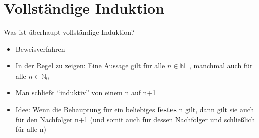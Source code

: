 \def\tutdate{17.11.2016}



\section{Vollständige Induktion}
\begin{frame} {Was ist überhaupt vollständige Induktion?}
	\begin{itemize}
		\item Beweisverfahren
		\item In der Regel zu zeigen: Eine Aussage gilt für alle $n \in \mathbb{N}_+$, manchmal auch für alle $n \in \mathbb{N}_0$
		\item Man schließt ``induktiv'' von einem n auf n+1
		\item Idee: Wenn die Behauptung für ein beliebiges \textbf{festes} n gilt, dann gilt sie auch für den Nachfolger n+1 (und somit auch für dessen Nachfolger und schließlich für alle n)
	\end{itemize}
\end{frame}

